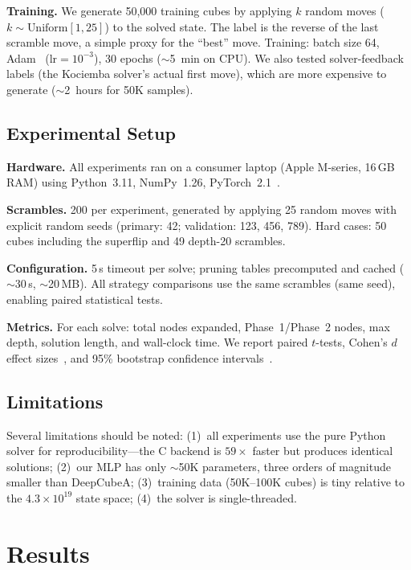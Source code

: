 \documentclass[graybox]{svmult}
\begin{document}
\textbf{Training.} We generate 50,000 training cubes by applying $k$ random moves ($k \sim \text{Uniform}[1,25]$) to the solved state. The label is the reverse of the last scramble move, a simple proxy for the ``best'' move. Training: batch size 64, Adam~\cite{kingma2015} ($\text{lr}=10^{-3}$), 30 epochs ($\sim$5~min on CPU). We also tested solver-feedback labels (the Kociemba solver's actual first move), which are more expensive to generate ($\sim$2~hours for 50K samples).

\subsection{Experimental Setup}
\label{sec:setup}

\textbf{Hardware.} All experiments ran on a consumer laptop (Apple M-series, 16\,GB RAM) using Python~3.11, NumPy~1.26, PyTorch~2.1~\cite{paszke2019}.

\textbf{Scrambles.} 200 per experiment, generated by applying 25 random moves with explicit random seeds (primary: 42; validation: 123, 456, 789). Hard cases: 50 cubes including the superflip and 49 depth-20 scrambles.

\textbf{Configuration.} 5\,s timeout per solve; pruning tables precomputed and cached ($\sim$30\,s, $\sim$20\,MB). All strategy comparisons use the same scrambles (same seed), enabling paired statistical tests.

\textbf{Metrics.} For each solve: total nodes expanded, Phase~1/Phase~2 nodes, max depth, solution length, and wall-clock time. We report paired $t$-tests, Cohen's $d$ effect sizes~\cite{cohen1988}, and 95\% bootstrap confidence intervals~\cite{efron1993}.

\subsection{Limitations}
Several limitations should be noted: (1)~all experiments use the pure Python solver for reproducibility---the C backend is $59\times$ faster but produces identical solutions; (2)~our MLP has only $\sim$50K parameters, three orders of magnitude smaller than DeepCubeA; (3)~training data (50K--100K cubes) is tiny relative to the $4.3 \times 10^{19}$ state space; (4)~the solver is single-threaded.

\section{Results}
\label{sec:results}
\end{document}
